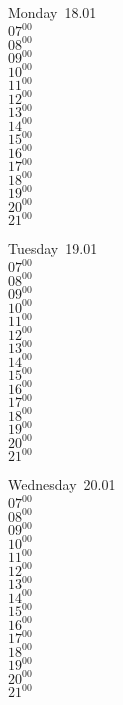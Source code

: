 \documentclass[11pt,a4paper]{book}\usepackage[]{graphicx}\usepackage[]{color}
\begin{document}
\begin{headerbox}
\end{headerbox}
\begin{weekdaybox}
  Monday~18.01\\
  { 
  \vfill
  $07^{00}$\\
$08^{00}$\\
$09^{00}$\\
$10^{00}$\\
$11^{00}$\\
$12^{00}$\\
$13^{00}$\\
$14^{00}$\\
$15^{00}$\\
$16^{00}$\\
$17^{00}$\\
$18^{00}$\\
$19^{00}$\\
$20^{00}$\\
$21^{00}$\\
  }
\end{weekdaybox}
\begin{weekdaybox}
  Tuesday~19.01\\
  { 
  \vfill
  $07^{00}$\\
$08^{00}$\\
$09^{00}$\\
$10^{00}$\\
$11^{00}$\\
$12^{00}$\\
$13^{00}$\\
$14^{00}$\\
$15^{00}$\\
$16^{00}$\\
$17^{00}$\\
$18^{00}$\\
$19^{00}$\\
$20^{00}$\\
$21^{00}$\\
  }
\end{weekdaybox}
\begin{weekdaybox}
  Wednesday~20.01\\
  { 
  \vfill
  $07^{00}$\\
$08^{00}$\\
$09^{00}$\\
$10^{00}$\\
$11^{00}$\\
$12^{00}$\\
$13^{00}$\\
$14^{00}$\\
$15^{00}$\\
$16^{00}$\\
$17^{00}$\\
$18^{00}$\\
$19^{00}$\\
$20^{00}$\\
$21^{00}$\\
  }
\end{weekdaybox}
\end{document}
